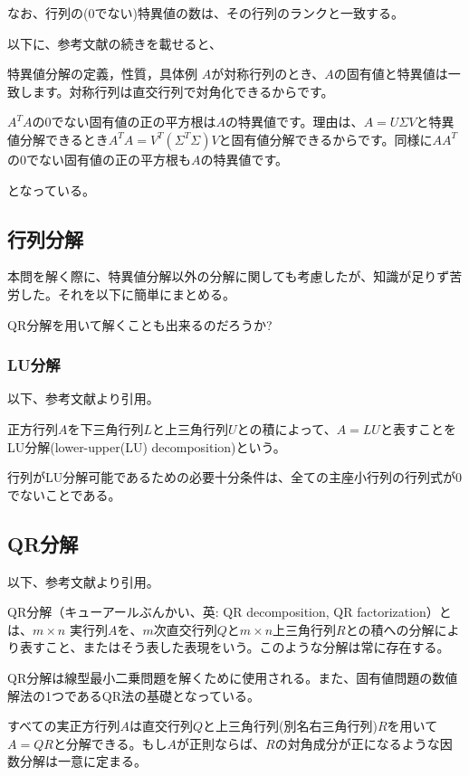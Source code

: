 \documentclass[a4paper, 10pt, dvipdfmx]{jlreq}
\begin{document}
なお、行列の(0でない)特異値の数は、その行列のランクと一致する。

以下に、参考文献の続きを載せると、

\begin{itembox}[l]{特異値分解の定義，性質，具体例\cite{site:3}}
  $A$が対称行列のとき、$A$の固有値と特異値は一致します。対称行列は直交行列で対角化できるからです。

  $A^TA$の0でない固有値の正の平方根は$A$の特異値です。理由は、$A=U\Sigma V$と特異値分解できるとき$A^TA=V^T(\Sigma^T\Sigma)V$と固有値分解できるからです。同様に$AA^T$の0でない固有値の正の平方根も$A$の特異値です。
\end{itembox}

となっている。

\subsection*{行列分解}

本問を解く際に、特異値分解以外の分解に関しても考慮したが、知識が足りず苦労した。それを以下に簡単にまとめる。

QR分解を用いて解くことも出来るのだろうか?

\subsubsection*{LU分解}

以下、参考文献\cite{site:4}より引用。

正方行列$A$を下三角行列$L$と上三角行列$U$との積によって、$A=LU$と表すことをLU分解(lower-upper(LU) decomposition)という。

行列がLU分解可能であるための必要十分条件は、全ての主座小行列の行列式が0でないことである。

\subsection*{QR分解}

以下、参考文献\cite{site:5}より引用。

QR分解（キューアールぶんかい、英: QR decomposition, QR factorization）とは、$m \times n$ 実行列$A$を、$m$次直交行列$Q$と$m \times  n$上三角行列$R$との積への分解により表すこと、またはそう表した表現をいう。このような分解は常に存在する。

QR分解は線型最小二乗問題を解くために使用される。また、固有値問題の数値解法の1つであるQR法の基礎となっている。

すべての実正方行列$A$は直交行列$Q$と上三角行列(別名右三角行列)$R$を用いて$A=QR$と分解できる。もし$A$が正則ならば、$R$の対角成分が正になるような因数分解は一意に定まる。
\end{document}
